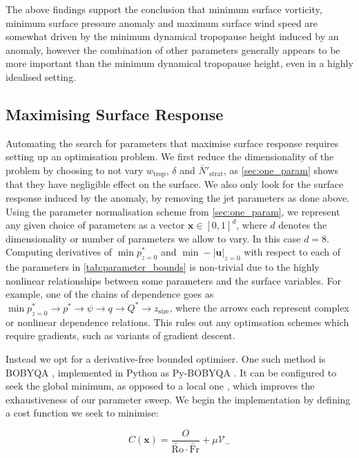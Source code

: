 \documentclass{article}
\begin{document}
The above findings support the conclusion that minimum surface vorticity, minimum surface pressure anomaly and maximum surface wind speed are somewhat driven by the minimum dynamical tropopause height induced by an anomaly, however the combination of other parameters generally appears to be more important than the minimum dynamical tropopause height, even in a highly idealised setting.

\subsection{Maximising Surface Response}\label{sec:optimiser}

Automating the search for parameters that maximise surface response requires setting up an optimisation problem.
We first reduce the dimensionality of the problem by choosing to not vary $w_\text{trop}$, $\delta$ and $\overline{N}'_\text{strat}$, as \cref{sec:one_param} shows that they have negligible effect on the surface.
We also only look for the surface response induced by the anomaly, by removing the jet parameters as done above.
Using the parameter normalisation scheme from \cref{sec:one_param}, we represent any given choice of parameters as a vector $\bm{x} \in [0,1]^d$, where $d$ denotes the dimensionality or number of parameters we allow to vary.
In this case $d=8$.
Computing derivatives of $\min p^*_{z=0}$ and $\min -|\bm{u}|_{z=0}$ with respect to each of the parameters in \cref{tab:parameter_bounds} is non-trivial due to the highly nonlinear relationships between some parameters and the surface variables.
For example, one of the chains of dependence goes as $\min p^*_{z=0} \to p^* \to \psi \to  q \to  Q^* \to z_\text{size}$, where the arrows each represent complex or nonlinear dependence relations.
This rules out any optimsation schemes which require gradients, such as variants of gradient descent.

Instead we opt for a derivative-free bounded optimiser.
One such method is BOBYQA \cite{Powell2009}, implemented in Python as Py-BOBYQA \cite{Cartis2019}.
It can be configured to seek the global minimum, as opposed to a local one \cite{Cartis2021}, which improves the exhaustiveness of our parameter sweep.
We begin the implementation by defining a cost function we seek to minimise:

\begin{equation}\label{cost}
    C(\bm{x}) = \frac{O}{\tilde{\mathrm{Ro}}\cdot \tilde{\mathrm{Fr}}} + \mu \mathcal{V}_-
\end{equation}
\end{document}
